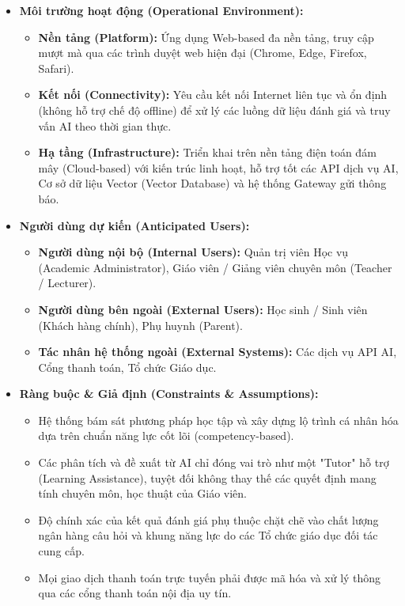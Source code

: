 \documentclass[a4paper,12pt]{article}
\begin{document}
	\begin{itemize}
		\item \textbf{Môi trường hoạt động (Operational Environment):}
		\begin{itemize}
			\item \textbf{Nền tảng (Platform):} Ứng dụng Web-based đa nền tảng, truy cập mượt mà qua các trình duyệt web hiện đại (Chrome, Edge, Firefox, Safari).
			\item \textbf{Kết nối (Connectivity):} Yêu cầu kết nối Internet liên tục và ổn định (không hỗ trợ chế độ offline) để xử lý các luồng dữ liệu đánh giá và truy vấn AI theo thời gian thực.
			\item \textbf{Hạ tầng (Infrastructure):} Triển khai trên nền tảng điện toán đám mây (Cloud-based) với kiến trúc linh hoạt, hỗ trợ tốt các API dịch vụ AI, Cơ sở dữ liệu Vector (Vector Database) và hệ thống Gateway gửi thông báo.
		\end{itemize}
		
		\item \textbf{Người dùng dự kiến (Anticipated Users):}
		\begin{itemize}
			\item \textbf{Người dùng nội bộ (Internal Users):} Quản trị viên Học vụ (Academic Administrator), Giáo viên / Giảng viên chuyên môn (Teacher / Lecturer).
			\item \textbf{Người dùng bên ngoài (External Users):} Học sinh / Sinh viên (Khách hàng chính), Phụ huynh (Parent).
			\item \textbf{Tác nhân hệ thống ngoài (External Systems):} Các dịch vụ API AI, Cổng thanh toán, Tổ chức Giáo dục.
		\end{itemize}
		
		\item \textbf{Ràng buộc \& Giả định (Constraints \& Assumptions):}
		\begin{itemize}
			\item Hệ thống bám sát phương pháp học tập và xây dựng lộ trình cá nhân hóa dựa trên chuẩn năng lực cốt lõi (competency-based).
			\item Các phân tích và đề xuất từ AI chỉ đóng vai trò như một "Tutor" hỗ trợ (Learning Assistance), tuyệt đối không thay thế các quyết định mang tính chuyên môn, học thuật của Giáo viên.
			\item Độ chính xác của kết quả đánh giá phụ thuộc chặt chẽ vào chất lượng ngân hàng câu hỏi và khung năng lực do các Tổ chức giáo dục đối tác cung cấp.
			\item Mọi giao dịch thanh toán trực tuyến phải được mã hóa và xử lý thông qua các cổng thanh toán nội địa uy tín.
		\end{itemize}
		

\end{itemize}
\end{document}
